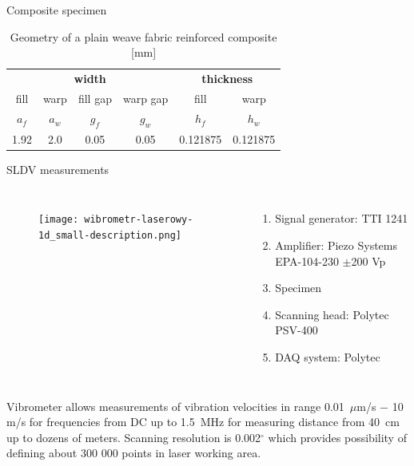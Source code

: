 \documentclass[10pt]{beamer} %
\begin{document}
\begin{frame}[t,label=frame12]{Composite specimen}
\begin{table}[h]
	\renewcommand{\arraystretch}{1.1}
	\centering \footnotesize
	\caption{Geometry of a plain weave fabric reinforced composite [mm]}
	\begin{tabular}{cccccc} 
		\toprule
		\multicolumn{4}{c}{\textbf{width} }	& \multicolumn{2}{c}{\textbf{thickness} }  \\ 
		\cmidrule(lr){1-4} \cmidrule(lr){5-6} 
		fill & warp & fill gap& warp gap& fill & warp\\
		$a_f$ &$a_w$& $g_f$  & $g_w$  & $h_f$& $h_w$ \\ 
		\cmidrule(lr){1-2} \cmidrule(lr){3-4} \cmidrule(lr){5-6}
		1.92 &2.0& 0.05& 0.05 & 0.121875 & 0.121875 \\
		\bottomrule 
	\end{tabular} 
	\label{tab:weave_geo}
\end{table}
\end{frame}
\begin{frame}[t,label=frame13]{SLDV measurements}
\begin{columns}[T]
	\begin{figure}
	\texttt{[image: wibrometr-laserowy-1d\_small-description.png]}
	\end{figure}
	\begin{enumerate}
	\item Signal generator: TTI 1241 
	\item Amplifier: Piezo Systems EPA-104-230 $\pm$200 Vp
	\item Specimen
	\item Scanning head: Polytec PSV-400
	\item DAQ system: Polytec
	\end{enumerate}
\end{columns}
{\small
 Vibrometer allows measurements of vibration velocities in range 0.01~$\mu$m/s $-$ 10 m/s for frequencies from DC up to 1.5~MHz for measuring distance from 40~cm up to dozens of meters. Scanning resolution is 0.002$^{\circ}$  which provides possibility of defining about 300 000 points in laser working area.}
\end{frame}
\end{document}
